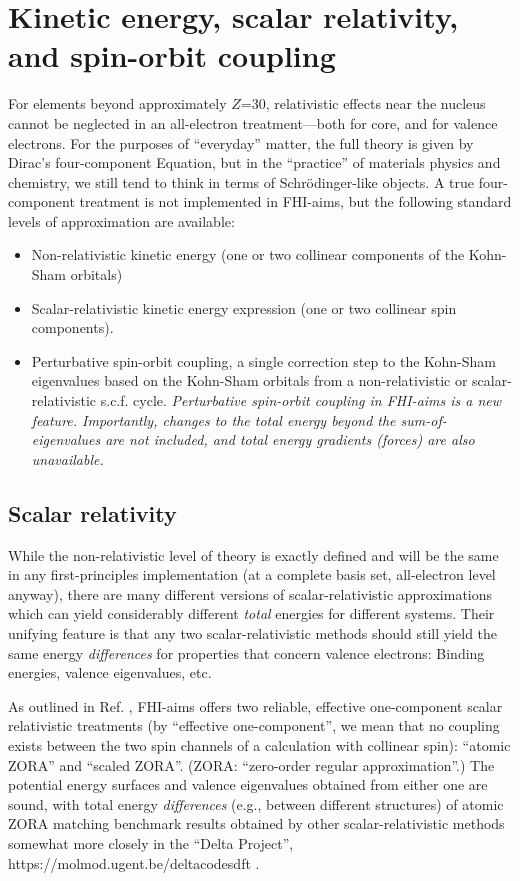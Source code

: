 \section{Kinetic energy, scalar relativity, and spin-orbit coupling}
\label{Sec:rel}

For elements beyond approximately $Z$=30, relativistic effects near
the nucleus cannot be neglected in an all-electron treatment---both
for core, and for valence electrons. For the purposes of ``everyday'' matter,
the full theory is given by Dirac's four-component Equation, but in the
``practice'' of materials physics and chemistry, we still tend to think in
terms of Schr\"odinger-like objects. A true four-component treatment is not
implemented in FHI-aims, but the following standard levels of approximation
are available: 
\begin{itemize}
  \item Non-relativistic kinetic energy (one or two collinear 
    components of the Kohn-Sham orbitals)
  \item Scalar-relativistic kinetic energy expression (one or two collinear
    spin components). 
  \item Perturbative spin-orbit coupling, a single correction step to the
    Kohn-Sham eigenvalues based on the Kohn-Sham orbitals from a
    non-relativistic or scalar-relativistic s.c.f. cycle. \emph{Perturbative
      spin-orbit coupling in FHI-aims is a new feature. Importantly,
      changes to the total  
      energy beyond the sum-of-eigenvalues are not included, and total energy 
      gradients (forces) are also unavailable.}
\end{itemize}

\subsection*{Scalar relativity}

While the non-relativistic level of theory is exactly
defined and will be the same in any first-principles implementation (at a
complete basis set, all-electron level anyway), there are many different
versions of scalar-relativistic approximations which can yield
considerably different \emph{total} energies for different systems. Their
unifying feature is that any two scalar-relativistic methods should still
yield the same energy \emph{differences} for properties that concern
valence electrons: Binding energies, valence eigenvalues, etc. 

As outlined in Ref. \cite{Blum08}, FHI-aims offers two reliable, effective
one-component scalar relativistic treatments (by ``effective one-component'',
we mean that no coupling exists between the two spin channels of a calculation
with collinear spin): ``atomic ZORA'' and ``scaled ZORA''. (ZORA: ``zero-order
regular approximation''.) The potential energy surfaces and valence
eigenvalues obtained from either one are sound, with total energy
\emph{differences} (e.g., between different structures) of atomic ZORA
matching benchmark results obtained by other scalar-relativistic
methods somewhat more closely in the ``Delta Project'',
https://molmod.ugent.be/deltacodesdft .   

